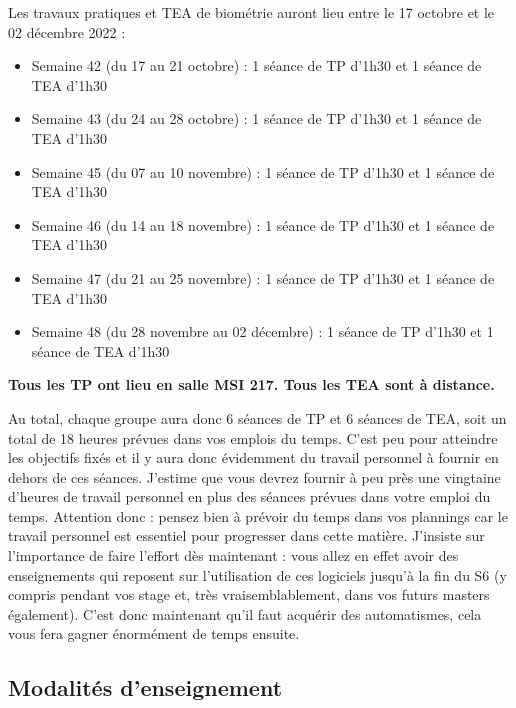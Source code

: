 \documentclass[
  a4paper,
  DIV=11,
  numbers=noendperiod,
  oneside]{scrreprt}
\providecommand{\tightlist}{%
  \setlength{\itemsep}{0pt}\setlength{\parskip}{0pt}}\usepackage{longtable,booktabs,array}
\begin{document}
Les travaux pratiques et TEA de biométrie auront lieu entre le 17
octobre et le 02 décembre 2022 :

\begin{itemize}
\tightlist
\item
  Semaine 42 (du 17 au 21 octobre) : 1 séance de TP d'1h30 et 1 séance
  de TEA d'1h30
\item
  Semaine 43 (du 24 au 28 octobre) : 1 séance de TP d'1h30 et 1 séance
  de TEA d'1h30
\item
  Semaine 45 (du 07 au 10 novembre) : 1 séance de TP d'1h30 et 1 séance
  de TEA d'1h30
\item
  Semaine 46 (du 14 au 18 novembre) : 1 séance de TP d'1h30 et 1 séance
  de TEA d'1h30
\item
  Semaine 47 (du 21 au 25 novembre) : 1 séance de TP d'1h30 et 1 séance
  de TEA d'1h30
\item
  Semaine 48 (du 28 novembre au 02 décembre) : 1 séance de TP d'1h30 et
  1 séance de TEA d'1h30
\end{itemize}

\textbf{Tous les TP ont lieu en salle MSI 217. Tous les TEA sont à
distance.}

Au total, chaque groupe aura donc 6 séances de TP et 6 séances de TEA,
soit un total de 18 heures prévues dans vos emplois du temps. C'est peu
pour atteindre les objectifs fixés et il y aura donc évidemment du
travail personnel à fournir en dehors de ces séances. J'estime que vous
devrez fournir à peu près une vingtaine d'heures de travail personnel en
plus des séances prévues dans votre emploi du temps. Attention donc :
pensez bien à prévoir du temps dans vos plannings car le travail
personnel est essentiel pour progresser dans cette matière. J'insiste
sur l'importance de faire l'effort dès maintenant : vous allez en effet
avoir des enseignements qui reposent sur l'utilisation de ces logiciels
jusqu'à la fin du S6 (y compris pendant vos stage et, très
vraisemblablement, dans vos futurs masters également). C'est donc
maintenant qu'il faut acquérir des automatismes, cela vous fera gagner
énormément de temps ensuite.

\hypertarget{modalituxe9s-denseignement}{%
\subsection*{Modalités
d'enseignement}\label{modalituxe9s-denseignement}}
\end{document}
